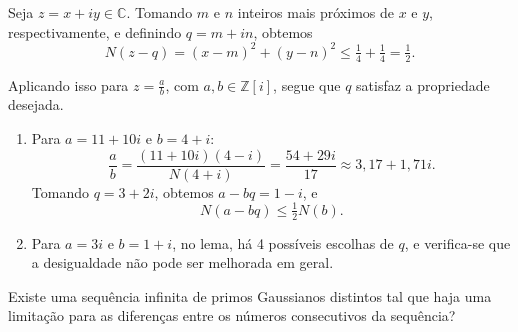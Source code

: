 Seja $z = x + iy \in \mathbb{C}$. Tomando $m$ e $n$ inteiros mais próximos de $x$ e $y$, respectivamente, e definindo $q = m + in$, obtemos
\[
N(z - q) = (x-m)^2 + (y-n)^2 \leq \tfrac{1}{4} + \tfrac{1}{4} = \tfrac{1}{2}.
\]

Aplicando isso para $z = \tfrac{a}{b}$, com $a,b \in \mathbb{Z}[i]$, segue que $q$ satisfaz a propriedade desejada.

\begin{exemplo}
    \begin{enumerate}
        \item Para $a = 11 + 10i$ e $b = 4+i$:
        \[
            \frac{a}{b} = \frac{(11+10i)(4-i)}{N(4+i)} = \frac{54+29i}{17} \approx 3{,}17 + 1{,}71i.
        \]
        Tomando $q = 3 + 2i$, obtemos $a - bq = 1 - i$, e
        \[
            N(a-bq) \leq \tfrac{1}{2}N(b).
        \]

        \item Para $a = 3i$ e $b = 1+i$, no lema, há 4 possíveis escolhas de $q$, e verifica-se que a desigualdade não pode ser melhorada em geral.
    \end{enumerate}
\end{exemplo}


\begin{questao}
    Existe uma sequência infinita de primos Gaussianos distintos tal que haja uma 
    limitação para as diferenças entre os números consecutivos da sequência?
\end{questao}
